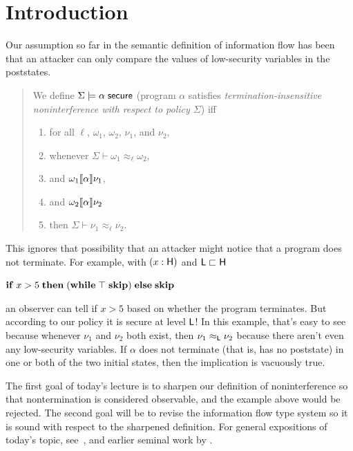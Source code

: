\documentclass[11pt]{article}
\begin{document}
\maketitle

\section{Introduction}

Our assumption so far in the semantic definition of information flow has been
that an attacker can only compare the values of low-security variables in the
poststates.
\begin{quote}
  We define $\Sigma \models \alpha\; \mathsf{secure}$ (program $\alpha$ satisfies
  \emph{termination-insensitive noninterference with respect to policy
    $\Sigma$}) \newline iff
  \begin{enumerate}[]
  \item for all $\ell$, $\omega_1$, $\omega_2$, $\nu_1$, and $\nu_2$,
  \item whenever $\Sigma \vdash \omega_1 \approx_\ell \omega_2$,
  \item and $\omega_1 \llbracket \alpha \rrbracket \nu_1$,
  \item and $\omega_2 \llbracket \alpha \rrbracket \nu_2$
  \item then $\Sigma \vdash \nu_1 \approx_\ell \nu_2$.
  \end{enumerate}
\end{quote}
This ignores that possibility that an attacker might notice that a program
does not terminate.  For example, with $(x : \mathsf{H})$ and $\mathsf{L} \sqsubset \mathsf{H}$
\begin{tabbing}
  \qquad $\mathbf{if}\; x > 5\; \mathbf{then}\; (\mathbf{while}\; \top\; \mathbf{skip})\; \mathbf{else}\; \mathbf{skip}$
\end{tabbing}
an observer can tell if $x > 5$ based on whether the program terminates.  But
according to our policy it is secure at level $\mathsf{L}$!  In this example, that's
easy to see because whenever $\nu_1$ and $\nu_2$ both exist, then
$\nu_1 \approx_{\mathsf{L}} \nu_2$ because there aren't even any low-security
variables.  If $\alpha$ does not terminate (that is, has no poststate) in one or
both of the two initial states, then the implication is vacuously true.

The first goal of today's lecture is to sharpen our definition of
noninterference so that nontermination is considered observable, and the example
above would be rejected.  The second goal will be to revise the information flow
type system so it is sound with respect to the sharpened definition.  For
general expositions of today's topic, see~\citet{Hedin12sss,Sabelfeld03comm},
and earlier seminal work by \citet{Volpano97csfw}.
\end{document}
